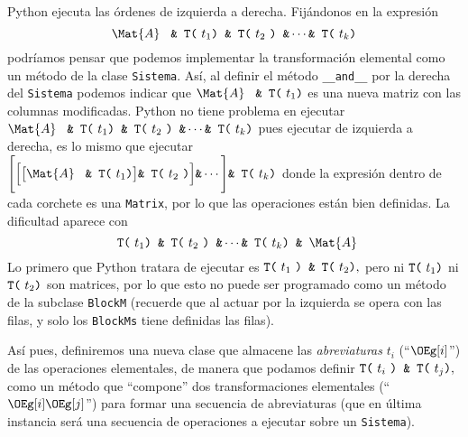\documentclass[11pt]{report}
\begin{document}
Python ejecuta las órdenes de izquierda a derecha. Fijándonos en la
expresión
\begin{displaymath}
  \Mat{A}\ \text{\tt{ \& T(}}\ t_1 \text{\tt{) \& T(}}\ t_2\ \text{\tt{) \&}} \cdots \text{\tt{\& T(}}\ t_k \text{\tt{)}} 
\end{displaymath}
podríamos pensar que podemos implementar la transformación elemental
como un método de la clase \texttt{Sistema}. Así, al definir el método
\texttt{\_\_and\_\_} por la derecha del \texttt{Sistema} podemos indicar que
\begin{math}
  \Mat{A}\ \text{\tt{ \& T(}}\ t_1 \text{\tt{)}}
\end{math}
es una nueva matriz con las columnas modificadas. Python no tiene
problema en ejecutar
\begin{math}
  \Mat{A}\ \text{\tt{ \& T(}}\ t_1 \text{\tt{) \& T(}}\ t_2\ \text{\tt{) \&}} \cdots \text{\tt{\& T(}}\ t_k \text{\tt{)}} 
\end{math}
pues ejecutar de izquierda a derecha, es lo mismo que ejecutar
\begin{math}
  \Bigg[\Big[\big[\Mat{A}\ \text{\tt{ \& T(}}\ t_1 \text{\tt{)}}\big] \text{\tt{\& T(}}\ t_2\ \text{\tt{)}} \Big] \text{\tt{\&}} \cdots \Bigg]\text{\tt{\& T(}}\ t_k  \text{\tt{)}}
\end{math}
donde la expresión dentro de cada corchete es una \texttt{Matrix}, por lo que
las operaciones están bien definidas. La dificultad aparece con
\begin{displaymath}
  \text{\tt{ T(}}\ t_1 \text{\tt{) \& T(}}\ t_2\ \text{\tt{) \&}} \cdots \text{\tt{\& T(}}\ t_k \text{\tt{) \& }} \Mat{A}
\end{displaymath}
Lo primero que Python tratara de ejecutar es
\begin{math}
    \text{\tt{T(}}\ t_1\ \text{\tt{) \& T(}} \ t_2 \text{\tt{)}},
\end{math}
pero ni \(\text{\tt{T(}}\ t_1 \text{\tt{)}}\) ni \(\text{\tt{T(}}\ t_2
\text{\tt{)}}\) son matrices, por lo que esto no puede ser programado
como un método de la subclase \texttt{BlockM} (recuerde que al actuar por la
izquierda se opera con las filas, y solo los \texttt{BlockMs} tiene definidas
las filas).

Así pues, definiremos una nueva clase que almacene las \emph{abreviaturas}
\(t_i\) (``\(\OEg[i]\)'') de las operaciones elementales, de manera que
podamos definir
\begin{math}
  \text{\tt{T(}}\ t_i\ \text{\tt{) \& T(}} \ t_j \text{\tt{)}},
\end{math}
como un método que ``compone'' dos transformaciones elementales
(``\(\OEg[i]\OEg[j]\)'') para formar una secuencia de abreviaturas (que
en última instancia será una secuencia de operaciones a ejecutar sobre
un \texttt{Sistema}).
\end{document}
